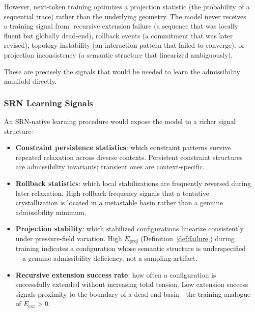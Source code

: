 \documentclass[11pt, a4paper]{article}
\theoremstyle{srn}
\theoremstyle{srnremark}
\begin{document}
However, next-token training optimizes a projection statistic
(the probability of a sequential trace) rather than the underlying
geometry.
The model never receives a training signal from: recursive extension
failure (a sequence that was locally fluent but globally dead-end),
rollback events (a commitment that was later revised), topology
instability (an interaction pattern that failed to converge), or
projection inconsistency (a semantic structure that linearized
ambiguously).

These are precisely the signals that would be needed to learn the
admissibility manifold directly.

\subsubsection*{SRN Learning Signals}

An SRN-native learning procedure would expose the model to a richer
signal structure:

\begin{itemize}
  \item \textbf{Constraint persistence statistics}: which constraint
    patterns survive repeated relaxation across diverse contexts.
    Persistent constraint structures are admissibility invariants;
    transient ones are context-specific.

  \item \textbf{Rollback statistics}: which local stabilizations are
    frequently reversed during later relaxation.
    High rollback frequency signals that a tentative crystallization
    is located in a metastable basin rather than a genuine admissibility
    minimum.

  \item \textbf{Projection stability}: which stabilized configurations
    linearize consistently under pressure-field variation.
    High $E_{\mathrm{proj}}$ (Definition~\ref{def:failure}) during
    training indicates a configuration whose semantic structure is
    underspecified---a genuine admissibility deficiency, not a
    sampling artifact.

  \item \textbf{Recursive extension success rate}: how often a
    configuration is successfully extended without increasing total
    tension.
    Low extension success signals proximity to the boundary of a
    dead-end basin---the training analogue of $E_{\mathrm{ext}} > 0$.
\end{itemize}
\end{document}
